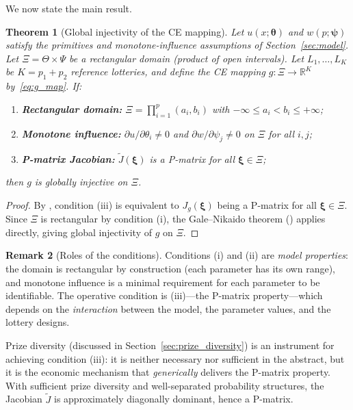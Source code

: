 \documentclass[11pt,a4paper]{article}
\newtheorem{theorem}{Theorem}[section]
\theoremstyle{definition}
\newtheorem{remark}[theorem]{Remark}
\newcommand{\R}{\mathbb{R}}
\newcommand{\btheta}{\boldsymbol{\theta}}
\newcommand{\bxi}{\boldsymbol{\xi}}
\newcommand{\bpsi}{\boldsymbol{\psi}}
\begin{document}
We now state the main result.

\begin{theorem}[Global injectivity of the CE mapping]
\label{thm:main}
Let $u(x; \btheta)$ and $w(p; \bpsi)$ satisfy the primitives and
monotone-influence assumptions of Section~\ref{sec:model}. Let
$\Xi = \Theta \times \Psi$ be a rectangular domain (product of open
intervals). Let $L_1, \ldots, L_K$ be $K = p_1 + p_2$ reference lotteries,
and define the CE mapping $g: \Xi \to \R^K$ by~\eqref{eq:g_map}. If:
\begin{enumerate}
    \item[(i)] \textbf{Rectangular domain:} $\Xi = \prod_{i=1}^p (a_i, b_i)$
    with $-\infty \leq a_i < b_i \leq +\infty$;

    \item[(ii)] \textbf{Monotone influence:}
    $\partial u / \partial \theta_i \neq 0$ and
    $\partial w / \partial \psi_j \neq 0$ on $\Xi$ for all $i, j$;

    \item[(iii)] \textbf{P-matrix Jacobian:}
    $\widetilde{J}(\bxi)$ is a P-matrix for all $\bxi \in \Xi$;
\end{enumerate}
then $g$ is globally injective on $\Xi$.
\end{theorem}

\begin{proof}
By , condition (iii) is equivalent to $J_g(\bxi)$
being a P-matrix for all $\bxi \in \Xi$. Since $\Xi$ is rectangular by
condition (i), the Gale--Nikaido theorem ()
applies directly, giving global injectivity of $g$ on $\Xi$.
\end{proof}

\begin{remark}[Roles of the conditions]
Conditions (i) and (ii) are \emph{model properties}: the domain is rectangular
by construction (each parameter has its own range), and monotone influence is
a minimal requirement for each parameter to be identifiable. The operative
condition is (iii)---the P-matrix property---which depends on the
\emph{interaction} between the model, the parameter values, and the lottery
designs.

Prize diversity (discussed in Section~\ref{sec:prize_diversity}) is an
instrument for achieving condition (iii): it is neither necessary nor
sufficient in the abstract, but it is the economic mechanism that
\emph{generically} delivers the P-matrix property. With sufficient prize
diversity and well-separated probability structures, the Jacobian
$\widetilde{J}$ is approximately diagonally dominant, hence a P-matrix.
\end{remark}
\end{document}
